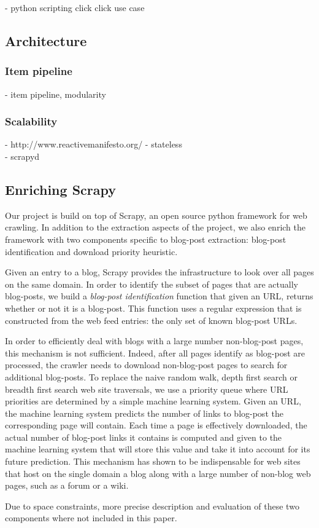 - python scripting click click use case


\subsection{Architecture}
\subsubsection{Item pipeline}
- item pipeline, modularity \\

\subsubsection{Scalability}
- http://www.reactivemanifesto.org/
- stateless \\
- scrapyd \\


\subsection{Enriching Scrapy}
Our project is build on top of Scrapy\cite{scrapy2013}, an open source python framework for web crawling. In addition to the extraction aspects of the project, we also enrich the framework with two components specific to blog-post extraction: blog-post identification and download priority heuristic.

Given an entry to a blog, Scrapy provides the infrastructure to look over all pages on the same domain. In order to identify the subset of pages that are actually blog-posts, we build a \emph{blog-post identification} function that given an URL, returns whether or not it is a blog-post. This function uses a regular expression that is constructed from the web feed entries: the only set of known blog-post URLs.

In order to efficiently deal with blogs with a large number non-blog-post pages, this mechanism is not sufficient. Indeed, after all pages identify as blog-post are processed, the crawler needs to download non-blog-post pages to search for additional blog-posts. To replace the naive random walk, depth first search or breadth first search web site traversals, we use a priority queue where URL priorities are determined by a simple machine learning system. Given an URL, the machine learning system predicts the number of links to blog-post the corresponding page will contain. Each time a page is effectively downloaded, the actual number of blog-post links it contains is computed and given to the machine learning system that will store this value and take it into account for its future prediction. This mechanism has shown to be indispensable for web sites that host on the single domain a blog along with a large number of non-blog web pages, such as a forum or a wiki.

Due to space constraints, more precise description and evaluation of these two components where not included in this paper.
